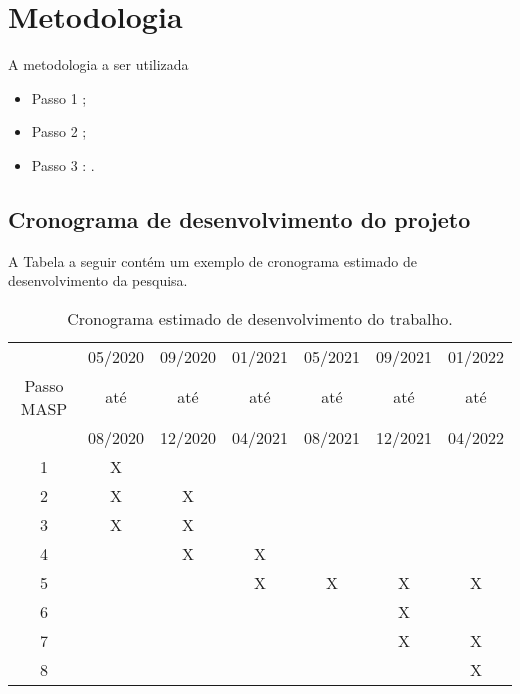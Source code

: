 


\chapter{Metodologia}
\label{cap_methodology}

A metodologia a ser utilizada 
\begin{itemize}
    \item Passo 1 ;
    \item Passo 2 ;
    \item Passo 3 : .
\end{itemize}

\newpage

\section{Cronograma de desenvolvimento do projeto}

A Tabela a seguir contém um exemplo de cronograma estimado de desenvolvimento da pesquisa.

\begin{table}[!h]
 \begin{center}
 \small
 \begin{tabular}{|c|c|c|c|c|c|c|}
 \hline
 &05/2020&09/2020&01/2021&05/2021&09/2021&01/2022\\
 Passo MASP&at\'e&at\'e&at\'e&at\'e&at\'e&at\'e\\
 &08/2020&12/2020&04/2021&08/2021&12/2021&04/2022\\
 \hline
 1&X&&&&&\\
 2&X&X&&&&\\
 3&X&X&&&&\\
 4&&X&X&&&\\
 5&&&X&X&X&X\\
 6&&&&&X&\\
 7&&&&&X&X\\
 8&&&&&&X\\
 \hline
 \end{tabular}
 \caption{Cronograma estimado de desenvolvimento do trabalho.}
 \end{center}
\end{table}


